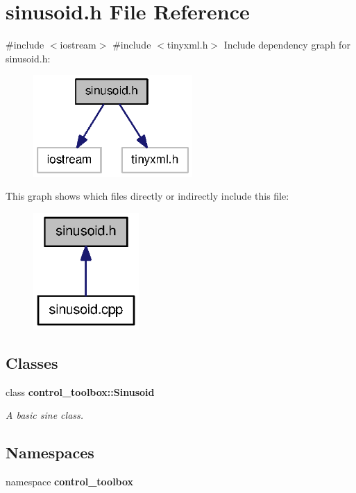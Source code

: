 \section{sinusoid.\-h \-File \-Reference}
\label{sinusoid_8h}
{\ttfamily \#include $<$iostream$>$}\*
{\ttfamily \#include $<$tinyxml.\-h$>$}\*
\-Include dependency graph for sinusoid.\-h\-:
\nopagebreak
\begin{figure}[H]
\begin{center}
\leavevmode
\includegraphics[width=172pt]{sinusoid_8h__incl}
\end{center}
\end{figure}
\-This graph shows which files directly or indirectly include this file\-:
\nopagebreak
\begin{figure}[H]
\begin{center}
\leavevmode
\includegraphics[width=114pt]{sinusoid_8h__dep__incl}
\end{center}
\end{figure}
\subsection*{\-Classes}
\begin{DoxyCompactItemize}
\item 
class {\bf control\-\_\-toolbox\-::\-Sinusoid}
\begin{DoxyCompactList}\small\item\em \-A basic sine class. \end{DoxyCompactList}\end{DoxyCompactItemize}
\subsection*{\-Namespaces}
\begin{DoxyCompactItemize}
\item 
namespace {\bf control\-\_\-toolbox}
\end{DoxyCompactItemize}
